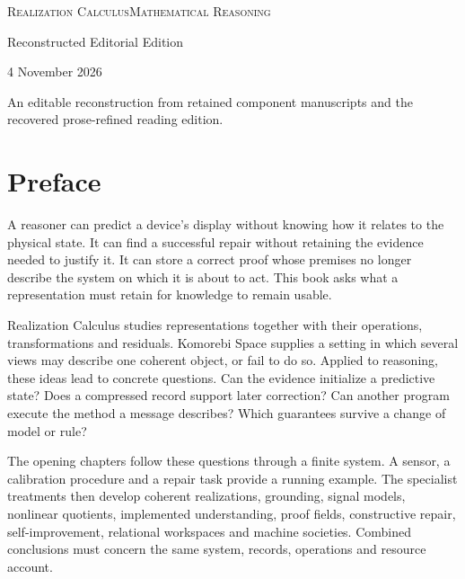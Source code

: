 \documentclass[11pt,oneside,openany]{book}
\numberwithin{equation}{section}
\begin{document}
\frontmatter
\hypersetup{pageanchor=false}
\begin{titlepage}\thispagestyle{empty}
{\small\scshape Realization Calculus\hfill Mathematical Reasoning}\par
{}
\vspace{.3in}{\Large Representation, Inference, Discovery, and Self-Correction\par}
\vspace{.4in}{\color{Accent}\rule{1.9in}{2pt}}\par
\vspace{.4in}{\Large Komorebi P.\par}\vfill
{\Large Reconstructed Editorial Edition\par}\medskip
{4 November 2026\par}\medskip
{\small An editable reconstruction from retained component manuscripts and the recovered prose-refined reading edition.}\par
\end{titlepage}
\hypersetup{pageanchor=true}
\chapter{Preface}
A reasoner can predict a device's display without knowing how it relates to the physical state. It can find a successful repair without retaining the evidence needed to justify it. It can store a correct proof whose premises no longer describe the system on which it is about to act. This book asks what a representation must retain for knowledge to remain usable.

Realization Calculus studies representations together with their operations, transformations and residuals. Komorebi Space supplies a setting in which several views may describe one coherent object, or fail to do so. Applied to reasoning, these ideas lead to concrete questions. Can the evidence initialize a predictive state? Does a compressed record support later correction? Can another program execute the method a message describes? Which guarantees survive a change of model or rule?

The opening chapters follow these questions through a finite system. A sensor, a calibration procedure and a repair task provide a running example. The specialist treatments then develop coherent realizations, grounding, signal models, nonlinear quotients, implemented understanding, proof fields, constructive repair, self-improvement, relational workspaces and machine societies. Combined conclusions must concern the same system, records, operations and resource account.
\end{document}
